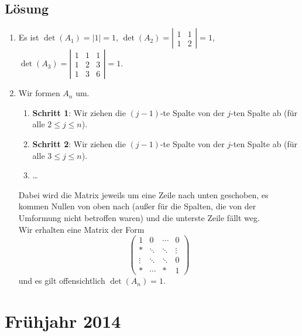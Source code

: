 \subsection{Lösung}
\begin{enumerate}
	\item Es ist \( \det(A_1) = |1| = 1 \), \( \det(A_2) = \left| \begin{smallmatrix}
		1 & 1 \\
		1 & 2
	\end{smallmatrix} \right| = 1 \), \( \det(A_3) = \left| \begin{smallmatrix}
		1 & 1 & 1 \\
		1 & 2 & 3 \\
		1 & 3 & 6
	\end{smallmatrix} \right| = 1 \).

	\item Wir formen \( A_n \) um.
	\begin{enumerate}
		\item \textbf{Schritt 1}: Wir ziehen die \( (j-1) \)-te Spalte von der \( j \)-ten Spalte ab (für alle \( 2 \leq j \leq n \)).
		\item \textbf{Schritt 2}: Wir ziehen die \( (j-1) \)-te Spalte von der \( j \)-ten Spalte ab (für alle \( 3 \leq j \leq n \)).
		\item \dots
	\end{enumerate}
	Dabei wird die Matrix jeweils um eine Zeile nach unten geschoben, es kommen Nullen von oben nach (außer für die Spalten, die von der Umformung nicht betroffen waren) und die unterste Zeile fällt weg.
	\\
	Wir erhalten eine Matrix der Form
	\begin{equation*}
		\begin{pmatrix}
			1 & 0 & \cdots & 0 \\
			\ast & \ddots & \ddots & \vdots \\
			\vdots & \ddots & \ddots & 0 \\
			\ast & \cdots & \ast & 1
		\end{pmatrix}
	\end{equation*}
	und es gilt offensichtlich \( \det(A_n) = 1 \).
\end{enumerate}

\newpage

\section{Frühjahr 2014}

